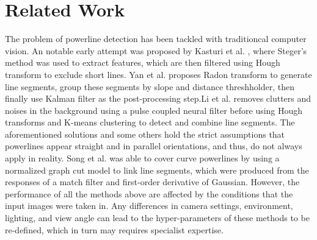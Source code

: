 \documentclass[journal]{IEEEtran}
\begin{document}
\section{Related Work}

The problem of powerline detection has been tackled with traditioncal computer vision. An notable early attempt was proposed by Kasturi et al. \cite{related_work_kasturi_2002}, where Steger's method \cite{related_work_steger_1998} was used to extract features, which are then filtered using Hough transform to exclude short lines. Yan et al. \cite{related_work_guanjian_yan_2007} proposes Radon transform to generate line segments, group these segments by slope and distance threshholder, then finally use Kalman filter as the post-processing step.Li et al. \cite{related_work_li_zhenrong_2010} removes clutters and noises in the background using a pulse coupled neural filter before using Hough transforms and K-means clustering to detect and combine line segments. The aforementioned solutions and some others \cite{related_work_candamo_2009, related_work_golightly_2005, related_work_zhengrong_li_2008, related_work_boris_alpatov_2016} hold the strict assumptions that powerlines appear straight and in parallel orientations, and thus, do not always apply in reality. Song et al. \cite{related_work_biqin_song_2014} was able to cover curve powerlines by using a normalized graph cut model to link line segments, which were produced from the responses of a match filter and first-order derivative of Gaussian. However, the performance of all the methods above are affected by the conditions that the input images were taken in. Any differences in camera settings, environment, lighting, and view angle can lead to the hyper-parameters of these methods to be re-defined, which in turn may requires specialist expertise.
\end{document}
